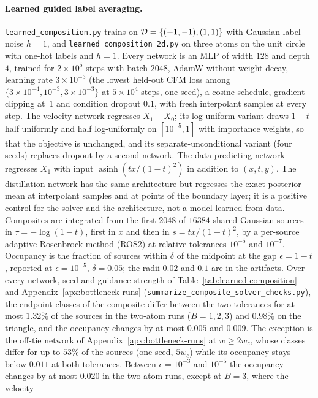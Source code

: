 \documentclass{article} %
\theoremstyle{plain}
\theoremstyle{definition}
\theoremstyle{remark}
\begin{document}
\paragraph{Learned guided label averaging.}
\label{app:learned-composition}
\texttt{learned\_composition.py} trains on $\mathcal{D}=\{(-1,-1),(1,1)\}$ with Gaussian label noise
$h=1$, and \texttt{learned\_composition\_2d.py} on three atoms on the unit circle with one-hot
labels and $h=1$. Every network is an MLP of width $128$ and depth $4$, trained for $2\times10^5$
steps with batch $2048$, AdamW without weight decay, learning rate $3\times10^{-3}$ (the lowest
held-out CFM loss among $\{3\times10^{-4},10^{-3},3\times10^{-3}\}$ at $5\times10^4$ steps, one
seed), a cosine schedule, gradient clipping at~$1$ and condition dropout $0.1$, with fresh
interpolant samples at every step. The velocity network regresses $X_1-X_0$; its log-uniform
variant draws $1-t$ half uniformly and half log-uniformly on $[10^{-5},1]$ with importance weights,
so that the objective is unchanged, and its separate-unconditional variant (four seeds) replaces
dropout by a second network. The data-predicting network regresses $X_1$ with input
$\operatorname{asinh}(tx/(1-t)^2)$ in addition to $(x,t,y)$. The distillation network has the same
architecture but regresses the exact posterior mean at interpolant samples and at points of the
boundary layer; it is a positive control for the solver and the architecture, not a model
learned from data. Composites are integrated from the first $2048$ of $16384$ shared Gaussian
sources in $\tau=-\log(1-t)$, first in $x$ and then in $s=tx/(1-t)^2$, by a per-source adaptive
Rosenbrock method (ROS2) at relative tolerances $10^{-5}$ and $10^{-7}$. Occupancy is
the fraction of sources within $\delta$ of the midpoint at the gap $\epsilon=1-t$, reported at
$\epsilon=10^{-5}$, $\delta=0.05$; the radii $0.02$ and $0.1$ are in the artifacts. Over every
network, seed and guidance strength of Table~\ref{tab:learned-composition} and
Appendix~\ref{apx:bottleneck-runs} (\texttt{summarize\_composite\_solver\_checks.py}), the endpoint
classes of the composite differ between the two tolerances for at most $1.32\%$ of the sources in
the two-atom runs ($B=1,2,3$) and $0.98\%$ on the triangle, and the occupancy changes by at most
$0.005$ and $0.009$. The exception is the off-tie network of Appendix~\ref{apx:bottleneck-runs} at
$w\ge2w_c$, whose classes differ for up to $53\%$ of the sources (one seed, $5w_c$) while its
occupancy stays below $0.011$ at both tolerances. Between $\epsilon=10^{-3}$ and $10^{-5}$ the
occupancy changes by at most $0.020$ in the two-atom runs, except at $B=3$, where the velocity
\end{document}
